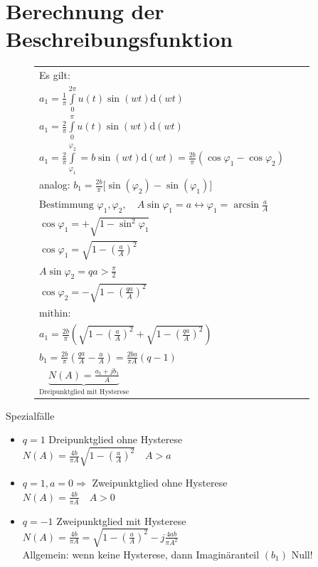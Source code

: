 \documentclass[ngerman]{tudscrreprt}
\begin{document}
\section{Berechnung der Beschreibungsfunktion}
\begin{figure}[htbp]
\begin{minipage}[c]{8.0cm}
\def\svgwidth{180pt} 
  
\end{minipage}
\begin{minipage}[c]{7cm}

\begin{tabular}{lll}
Es gilt: &&\\
$a_1 = \frac{1}{\pi} \int\limits_{0}^{2\pi} u(t) \sin{(wt)} \mathrm{d}(wt)$ &&\\
$a_1 = \frac{2}{\pi} \int\limits_{0}^{\pi} u(t) \sin{(wt)} \mathrm{d}(wt)$ &&\\
$a_1 = \frac{2}{\pi} \int\limits_{\varphi_1}^{\varphi_2}  = b\sin{(wt)} \mathrm{d}(wt) = \frac{2b}{\pi} (\cos{\varphi_1} - \cos{\varphi_2})$&&\\
analog:
$b_1 = \frac{2b}{\pi}\Big[ \sin{(\varphi_2)} - \sin{(\varphi_1)}\Big]$ &&\\
$\text{Bestimmung } \varphi_1, \varphi_2, \quad A\sin{\varphi_1} = a \leftrightarrow \varphi_1 = \arcsin{\frac{a}{A}} $&&\\
$\cos{\varphi_1} = +\sqrt{1 - \sin^2{\varphi_1}} $&&\\
$\cos{\varphi_1} = \sqrt{1 - (\frac{a}{A})^2}$ &&\\
$A\sin{\varphi_2} = q a > \frac{\pi}{2}$&&\\
$\cos{\varphi_2} = - \sqrt{1- (\frac{qa}{A})^2}$&&\\
$\text{mithin: }$&&\\
$a_1 = \frac{2b}{\pi} \left(  \sqrt{1- (\frac{a}{A})^2} + \sqrt{1- (\frac{qa}{A})^2}   \right)$&&\\
$b_1 = \frac{2b}{\pi} \left(  \frac{qa}{A} - \frac{a}{A}\right) = \frac{2ba}{\pi A} (q-1)$&&\\
$\underbrace{N(A) = \frac{a_1 + jb_1}{A}}_{\text{Dreipunktglied mit Hysterese}}$&&
\end{tabular}
\end{minipage}
\end{figure} 
Spezialfälle
\begin{itemize}
\item $q=1$ Dreipunktglied ohne Hysterese\\
$ N(A) = \frac{4b}{\pi A} \sqrt{ 1- (\frac{a}{A})^2} \quad A>a $
\item $q=1, a=0 \Rightarrow$ Zweipunktglied ohne Hysterese\\
$N(A) = \frac{4b}{\pi A} \quad A>0 $
\item $q=-1$ Zweipunktglied mit Hysterese \\
$N(A) = \frac{4b}{\pi A} = \sqrt{ 1 - (\frac{a}{A})^2 } - j \frac{4ab}{\pi A^2} $\\
Allgemein: wenn keine Hysterese, dann Imaginäranteil $(b_1)$ Null!
\end{itemize}
\end{document}
